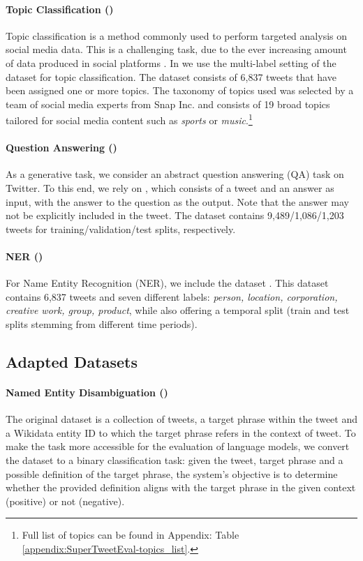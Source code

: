 \paragraph{Topic Classification ({\TweetTopic})} Topic classification is a method commonly used to perform targeted analysis on social media data. This is a challenging task, due to the ever increasing amount of data produced in social platforms \cite{weller2015accepting, stieglitz2018social}. In {\DATASET} we use the multi-label setting of the {\TweetTopic} dataset \cite{antypas-etal-2022-twitter} for topic classification. The dataset consists of 6,837 tweets that have been assigned one or more topics. The taxonomy of topics used was selected by a team of social media experts from Snap Inc. and consists of 19 broad topics tailored for social media content such as \textit{sports} or \textit{music}.\footnote{Full list of topics can be found in Appendix: Table \ref{appendix:SuperTweetEval-topics_list}.}

\paragraph{Question Answering ({\TweetQA})} As a generative task, we consider an abstract question answering (QA) task on Twitter. To this end, we rely on {\TweetQA} \cite{xiong-etal-2019-tweetqa}, which consists of a tweet and an answer as input, with the answer to the question as the output. Note that the answer may not be explicitly included in the tweet. The dataset contains 9,489/1,086/1,203 tweets for training/validation/test splits, respectively.

\paragraph{NER ({\TweetNER})} For Name Entity Recognition (NER), we include the {\TweetNER} dataset \cite{ushio-etal-2022-named}. This dataset contains 6,837 tweets and seven different labels: \textit{person, location, corporation, creative work, group, product}, while also offering a temporal split (train and test splits stemming from different time periods).

\subsection{Adapted Datasets}

\paragraph{Named Entity Disambiguation ({\TweetNERD})} The original {\TweetNERD} dataset \cite{mishra2022tweetnerd} is a collection of tweets, a target phrase within the tweet and a Wikidata entity ID to which the target phrase refers in the context of tweet. To make the task more accessible for the evaluation of language models, we convert the dataset to a binary classification task: given the tweet, target phrase and a possible definition of the target phrase, the system's objective is to determine whether the provided definition aligns with the target phrase in the given context (positive) or not (negative).

